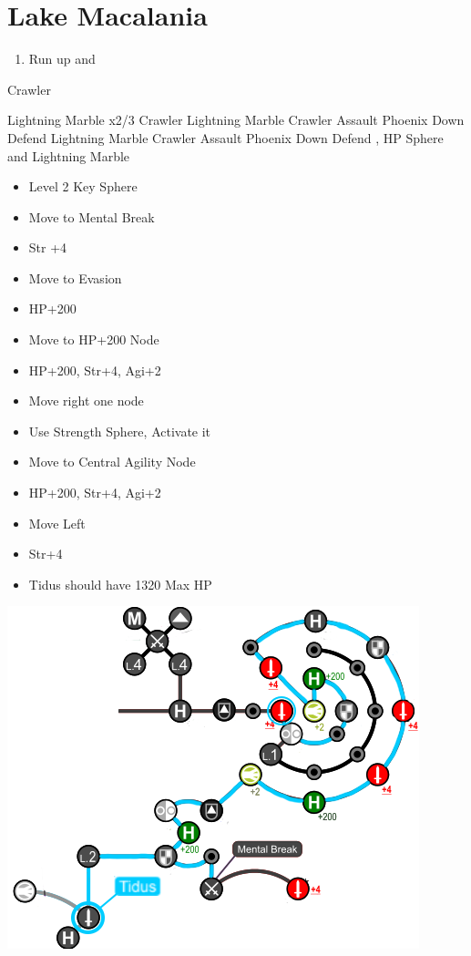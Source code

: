 \chapter{Lake Macalania}

\begin{enumerate}
	\item Run up and \sd
\end{enumerate}
\begin{battle}[1600]{Crawler}
\begin{itemize}
	\switch{\tidus}{\rikku}
	\rikkuf Lightning Marble x2/3 Crawler
	\kimahrif Lightning Marble Crawler
	\enemyf Assault \rikku
	\luluf Phoenix Down \rikku
	\switch{\kimahri}{\yuna}
	\yunaf Defend
	\rikkuf Lightning Marble Crawler
	\enemyf Assault \rikku
	\luluf Phoenix Down \rikku
	\switch{\yuna}{\tidus}
	\tidusf Defend
	\rikkuf \od, HP Sphere and Lightning Marble
\end{itemize}
\end{battle}
\begin{spheregrid}
\begin{itemize}
	\tidusf
	\begin{itemize}
		\item Level 2 Key Sphere
		\item Move to Mental Break
		\item Str +4
		\item Move to Evasion
		\item HP+200
		\item Move to HP+200 Node
		\item HP+200, Str+4, Agi+2
		\item Move right one node
		\item Use Strength Sphere, Activate it
		\item Move to Central Agility Node
		\item HP+200, Str+4, Agi+2
		\item Move Left
		\item Str+4
		\item Tidus should have 1320 Max HP
	\end{itemize}
	\includegraphics[width=.8\columnwidth]{graphics/Tidus_post_crawler}
\end{itemize}
\end{spheregrid}
